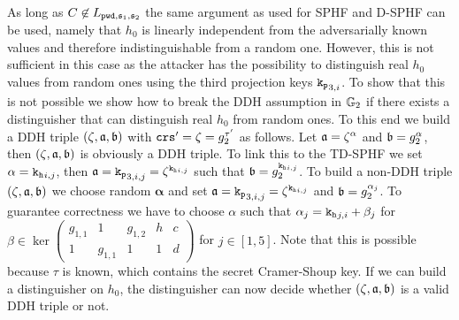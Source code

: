 As long as $C\not\in L_{\mathtt{pwd}, \mathfrak{s}_1, \mathfrak{s}_2}$ the same argument as used for \ac{SPHF} and \ac{D-SPHF} can be used, namely that $h_0$ is linearly independent from the adversarially known values and therefore indistinguishable from a random one.
However, this is not sufficient in this case as the attacker has the possibility to distinguish real $h_0$ values from random ones using the third projection keys $\mathtt{k_p}_{3,i}$.
To show that this is not possible we show how to break the \ac{DDH} assumption in $\mathbb{G}_2$ if there exists a distinguisher that can distinguish real $h_0$ from random ones.
To this end we build a \ac{DDH} triple $(\zeta, \mathfrak{a}, \mathfrak{b})$ with $\mathtt{crs}'=\zeta=g_2^{\tau'}$ as follows.
Let $\mathfrak{a}=\zeta^\alpha$ and $\mathfrak{b}=g_2^\alpha$, then $(\zeta, \mathfrak{a}, \mathfrak{b})$ is obviously a \ac{DDH} triple.
To link this to the \ac{TD-SPHF} we set $\alpha=\mathtt{k_h}_{i,j}$, then $\mathfrak{a}=\mathtt{k_p}_{3,i,j}=\zeta^{\mathtt{k_h}_{i,j}}$ such that $\mathfrak{b}=g_2^{\mathtt{k_h}_{i,j}}$. 
To build a non-DDH triple $(\zeta, \mathfrak{a}, \mathfrak{b})$ we choose random $\bm \alpha$ and set $\mathfrak{a}=\mathtt{k_p}_{3,i,j}=\zeta^{\mathtt{k_h}_{i,j}}$ and $\mathfrak{b}=g_2^{\alpha_{j}}$.
To guarantee correctness we have to choose $\alpha$ such that $\alpha_j=\mathtt{k_h}_{j,i}+\beta_j$ for $\beta\in\ker\begin{pmatrix}
  g_{1,1} & 1 & g_{1,2} & h & c \\
  1 & g_{1,1} & 1 & 1 & d
\end{pmatrix}$ for $j\in[1,5]$.
Note that this is possible because $\tau$ is known, which contains the secret Cramer-Shoup key.
If we can build a distinguisher on $h_0$, the distinguisher can now decide whether $(\zeta, \mathfrak{a}, \mathfrak{b})$ is a valid \ac{DDH} triple or not.


